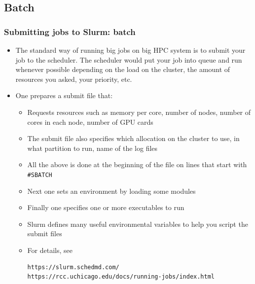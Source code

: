 \documentclass{beamer}
\begin{document}
\subsection{Batch}
\begin{frame}[fragile]
  \frametitle{Submitting jobs to Slurm: batch}
  \begin{itemize}
  \item The standard way of running big jobs on big HPC system is to submit your job to the scheduler. The scheduler would put your job into queue and run whenever possible depending on the load
    on the cluster, the amount of resources you asked, your priority, etc.
  \item One prepares a submit file that:
    \begin{itemize}
      \item Requests resources such as memory per core, number of nodes, number of cores in each node, number of GPU cards
      \item The submit file also specifies which allocation on the cluster to use, in what partition to run, name of the log files
      \item All the above is done at the beginning of the file on lines that start with {\color{mycolorcode}\verb|#SBATCH|}
      \item Next one sets an environment by loading some modules
      \item Finally one specifies one or more executables to run
      \item Slurm defines many useful environmental variables to help you script the submit files
      \item For details, see 
        {\color{mycolorcli}
\begin{verbatim}
https://slurm.schedmd.com/
https://rcc.uchicago.edu/docs/running-jobs/index.html
\end{verbatim}
          }
    \end{itemize}
  \end{itemize}
\end{frame}
\end{document}
